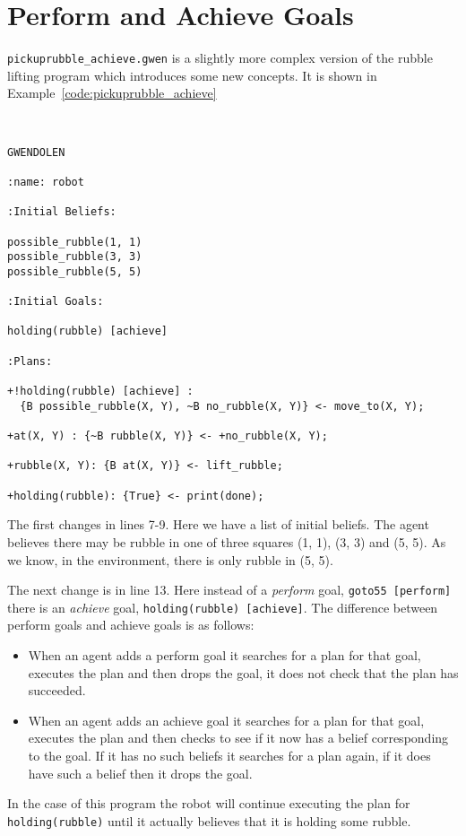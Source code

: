 \section{Perform and Achieve Goals}
\lstinline{pickuprubble_achieve.gwen} is a slightly more complex version of the rubble lifting program which introduces some new concepts.  It is shown in Example~\ref{code:pickuprubble_achieve}
\begin{ourexample}
\label{code:pickuprubble_achieve} \quad \\
\begin{lstlisting}[basicstyle=\sffamily,style=easslisting,language=Gwendolen]
GWENDOLEN

:name: robot

:Initial Beliefs:

possible_rubble(1, 1)
possible_rubble(3, 3)
possible_rubble(5, 5)

:Initial Goals:

holding(rubble) [achieve]

:Plans:

+!holding(rubble) [achieve] : 
  {B possible_rubble(X, Y), ~B no_rubble(X, Y)} <- move_to(X, Y);

+at(X, Y) : {~B rubble(X, Y)} <- +no_rubble(X, Y);

+rubble(X, Y): {B at(X, Y)} <- lift_rubble;

+holding(rubble): {True} <- print(done);
\end{lstlisting}
\end{ourexample}
The first changes in lines 7-9.  Here we have a list of initial beliefs.  The agent believes there may be rubble in one of three squares (1, 1), (3, 3) and (5, 5).  As we know, in the environment, there is only rubble in (5, 5).

The next change is in line 13.  Here instead of a \emph{perform} goal, \lstinline{goto55 [perform]} there is an \emph{achieve} goal, \lstinline{holding(rubble) [achieve]}.  The difference between perform goals and achieve goals is as follows:  
\begin{itemize}
\item When an agent adds a perform goal it searches for a plan for that goal, executes the plan and then drops the goal, it does not check that the plan has succeeded.
\item When an agent adds an achieve goal it searches for a plan for that goal, executes the plan and then checks to see if it now has a belief corresponding to the goal.  If it has no such beliefs it searches for a plan again, if it does have such a belief then it drops the goal.
\end{itemize}
In the case of this program the robot will continue executing the plan for \lstinline{holding(rubble)} until it actually believes that it is holding some rubble.

